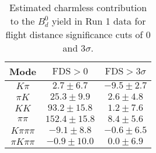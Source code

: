 \begin{table}[h]
  \centering
  \begin{tabular}{ccc}
      \toprule
      Mode & $\mathrm{FDS} > 0$ & $\mathrm{FDS} > 3\sigma$ \\
      \midrule
      $K\pi$ & $2.7 \pm 6.7$ & $-9.5 \pm 2.7$ \\
      $\pi K$ & $25.3 \pm 9.9$ & $2.6 \pm 4.8$ \\
      $KK$ & $93.2 \pm 15.8$ & $1.2 \pm 7.6$ \\
      $\pi\pi$ & $152.4 \pm 15.8$ & $8.4 \pm 5.6$ \\
      $K\pi\pi\pi$ & $-9.1 \pm 8.8$ & $-0.6 \pm 6.5$ \\
      $\pi K\pi\pi$ & $-0.9 \pm 10.0$ & $0.0 \pm 6.9$ \\
      \bottomrule
  \end{tabular}
  \caption{\small Estimated charmless contribution to the $B^{0}_{d}$ yield in Run 1 data for flight distance significance cuts of 0  and $3\sigma$.}
\label{tab:charmless_yields_Bd_run_1}
\end{table}
